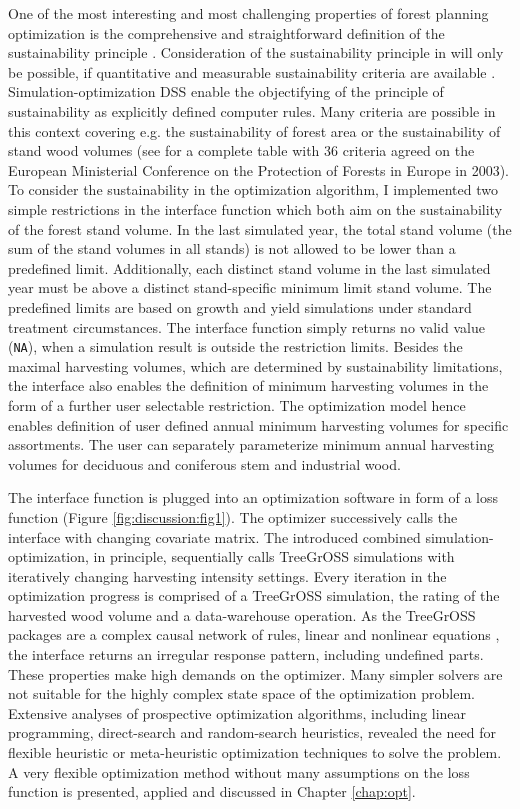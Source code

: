 One of the most interesting and most challenging properties of forest planning optimization is the comprehensive and straightforward definition of the sustainability principle \citep[p. 15]{kangas_2015}. Consideration of the sustainability principle in will only be possible, if quantitative and measurable sustainability criteria are available \citep[p. 101]{spellmann_2010}. Simulation-optimization DSS enable the objectifying of the principle of sustainability as explicitly defined computer rules. Many criteria are possible in this context covering e.g. the sustainability of forest area or the sustainability of stand wood volumes (see \citet[p. 102]{spellmann_2010} for a complete table with 36 criteria agreed on the European Ministerial Conference on the Protection of Forests in Europe in 2003). To consider the sustainability in the optimization algorithm, I implemented two simple restrictions in the interface function which both aim on the sustainability of the forest stand volume. In the last simulated year, the total stand volume (the sum of the stand volumes in all stands) is not allowed to be lower than a predefined limit. Additionally, each distinct stand volume in the last simulated year must be above a distinct stand-specific minimum limit stand volume. The predefined limits are based on growth and yield simulations under standard treatment circumstances. The interface function simply returns no valid value (\texttt{NA}), when a simulation result is outside the restriction limits. Besides the maximal harvesting volumes, which are determined by sustainability limitations, the interface also enables the definition of minimum harvesting volumes in the form of a further user selectable restriction. The optimization model hence enables definition of user defined annual minimum harvesting volumes for specific assortments. The user can separately parameterize minimum annual harvesting volumes for deciduous and coniferous stem and industrial wood.

The interface function is plugged into an optimization software in form of a loss function (Figure \ref{fig:discussion:fig1}). The optimizer successively calls the interface with changing covariate matrix. The introduced combined si\-mu\-la\-tion-op\-ti\-mi\-za\-tion, in principle, sequentially calls TreeGrOSS simulations with iteratively changing harvesting intensity settings. Every iteration in the optimization progress is comprised of a TreeGrOSS simulation, the rating of the harvested wood volume and a data-warehouse operation. As the TreeGrOSS packages are a complex causal network of rules, linear and nonlinear equations \citep[p. 180]{hansen_2014}, the interface returns an irregular response pattern, including undefined parts. These properties make high demands on the optimizer. Many simpler solvers are not suitable for the highly complex state space of the optimization problem. Extensive analyses of prospective optimization algorithms, including linear programming, direct-search and random-search heuristics, revealed the need for flexible heuristic or meta-heuristic optimization techniques to solve the problem. A very flexible optimization method without many assumptions on the loss function is presented, applied and discussed in Chapter \ref{chap:opt}.

